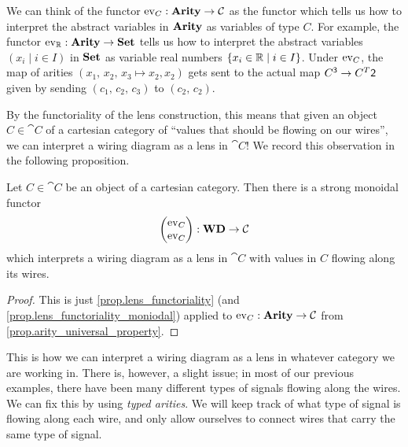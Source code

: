 \documentclass[DynamicalBook]{subfiles}
\begin{document}
We can think of the functor $\mathrm{ev}_C : \textbf{Arity} \to \mathcal{C}$ as the functor
which tells us how to interpret the abstract variables in $\textbf{Arity}$ as variables
of type $C$. For example, the functor $\mathrm{ev}_{\mathbb{R}} : \textbf{Arity} \to \textbf{Set}$ tells
us how to interpret the abstract variables $(x_i \mid i \in I)$ in $\textbf{Set}$ as
variable real numbers $\{x_i \in \mathbb{R} \mid i \in I\}$. Under $\mathrm{ev}_{C}$, the
map of arities $(x_1,\, x_2,\, x_3 \mapsto x_2, x_2)$ gets sent to the actual map
$C^{\mathsf{3}} \to C^T{\mathsf{2}}$ given by sending $(c_1,\, c_2,\, c_3)$ to
$(c_2,\, c_2)$.

By the functoriality of the lens construction, this means that given an object
$C \in \cat{C}$ of a cartesian category of ``values that should be flowing on
our wires'', we can interpret a wiring diagram as a lens in $\cat{C}$! We record
this observation in the following proposition.
\begin{proposition}\label{prop.wiring_diagram_as_lens}
  Let $C \in \cat{C}$ be an object of a cartesian category. Then there is a
  strong monoidal functor
  $$\begin{pmatrix}{\mathrm{ev}_C} \\ {\mathrm{ev}_C} \end{pmatrix} : \textbf{WD} \to \mathcal{C}$$
  which interprets a wiring diagram as a lens in $\cat{C}$ with values in $C$
  flowing along its wires.
\end{proposition}
\begin{proof}
  This is just \cref{prop.lens_functoriality} (and
  \cref{prop.lens_functoriality_moniodal}) applied to $\mathrm{ev}_C : \textbf{Arity} \to
  \mathcal{C}$ from \cref{prop.arity_universal_property}.
\end{proof}

This is how we can interpret a wiring diagram as a lens in whatever category we
are working in. There is, however, a slight issue; in most of our previous
examples, there have been many different types of signals flowing along the
wires. We can fix this by using \emph{typed arities}. We will keep track of what
type of signal is flowing along each wire, and only allow ourselves to connect
wires that carry the same type of signal.
\end{document}
